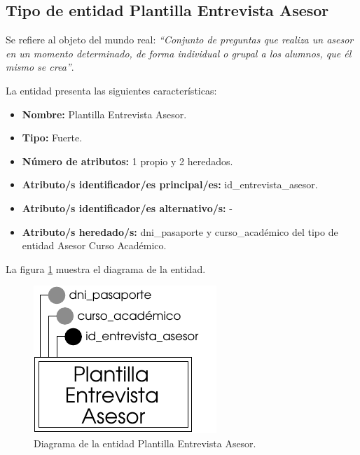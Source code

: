 \subsection{Tipo de entidad Plantilla Entrevista Asesor}

   \begin{description}

   \item[Definición] Se refiere al objeto del mundo real: \emph{``Conjunto de
   preguntas que realiza un asesor en un momento determinado, de forma
   individual o grupal a los alumnos, que él mismo se crea''}.

   \item[Características] La entidad presenta las siguientes características:
      \begin{itemize}
         \item \textbf{Nombre:} Plantilla Entrevista Asesor.
         \item \textbf{Tipo:} Fuerte.
         \item \textbf{Número de atributos:} 1 propio y 2 heredados.
         \item \textbf{Atributo/s identificador/es principal/es:} id\_entrevista\_asesor.
         \item \textbf{Atributo/s identificador/es alternativo/s:} -
         \item \textbf{Atributo/s heredado/s:} dni\_pasaporte y curso\_académico
         del tipo de entidad Asesor Curso Académico.
      \end{itemize}

   \item[Diagrama] La figura \ref{diagramaPlantEntAse} muestra el diagrama de la entidad.
   \item \begin{figure}[!ht]
            \begin{center}
            \includegraphics[]{07.Modelo_Entidad-Interrelacion/7.2.Analisis_Entidades/diagramas/plant_ent_ase.pdf}
            \caption{Diagrama de la entidad Plantilla Entrevista Asesor.}
            \label{diagramaPlantEntAse}
            \end{center}
         \end{figure}


\end{description}
